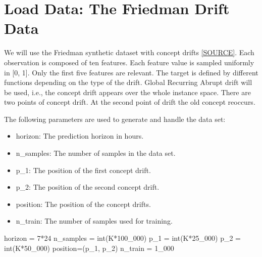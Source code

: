 \documentclass[
  letterpaper,
  DIV=11,
  numbers=noendperiod]{scrreprt}
\newenvironment{Shaded}{\begin{snugshade}}{\end{snugshade}}
\newcommand{\BuiltInTok}[1]{\textcolor[rgb]{0.00,0.23,0.31}{#1}}
\newcommand{\DecValTok}[1]{\textcolor[rgb]{0.68,0.00,0.00}{#1}}
\newcommand{\NormalTok}[1]{\textcolor[rgb]{0.00,0.23,0.31}{#1}}
\newcommand{\OperatorTok}[1]{\textcolor[rgb]{0.37,0.37,0.37}{#1}}
\providecommand{\tightlist}{%
  \setlength{\itemsep}{0pt}\setlength{\parskip}{0pt}}\usepackage{longtable,booktabs,array}
\begin{document}
\hypertarget{load-data-the-friedman-drift-data-1}{%
\section{Load Data: The Friedman Drift
Data}\label{load-data-the-friedman-drift-data-1}}

We will use the Friedman synthetic dataset with concept drifts
\href{https://riverml.xyz/0.18.0/api/datasets/synth/FriedmanDrift/}{{[}SOURCE{]}}.
Each observation is composed of ten features. Each feature value is
sampled uniformly in {[}0, 1{]}. Only the first five features are
relevant. The target is defined by different functions depending on the
type of the drift. Global Recurring Abrupt drift will be used, i.e., the
concept drift appears over the whole instance space. There are two
points of concept drift. At the second point of drift the old concept
reoccurs.

The following parameters are used to generate and handle the data set:

\begin{itemize}
\tightlist
\item
  horizon: The prediction horizon in hours.
\item
  n\_samples: The number of samples in the data set.
\item
  p\_1: The position of the first concept drift.
\item
  p\_2: The position of the second concept drift.
\item
  position: The position of the concept drifts.
\item
  n\_train: The number of samples used for training.
\end{itemize}

\begin{Shaded}
\begin{Highlighting}[]
\NormalTok{horizon }\OperatorTok{=} \DecValTok{7}\OperatorTok{*}\DecValTok{24}
\NormalTok{n\_samples }\OperatorTok{=} \BuiltInTok{int}\NormalTok{(K}\OperatorTok{*}\DecValTok{100\_000}\NormalTok{)}
\NormalTok{p\_1 }\OperatorTok{=} \BuiltInTok{int}\NormalTok{(K}\OperatorTok{*}\DecValTok{25\_000}\NormalTok{)}
\NormalTok{p\_2 }\OperatorTok{=} \BuiltInTok{int}\NormalTok{(K}\OperatorTok{*}\DecValTok{50\_000}\NormalTok{)}
\NormalTok{position}\OperatorTok{=}\NormalTok{(p\_1, p\_2)}
\NormalTok{n\_train }\OperatorTok{=} \DecValTok{1\_000}
\end{Highlighting}
\end{Shaded}
\end{document}
